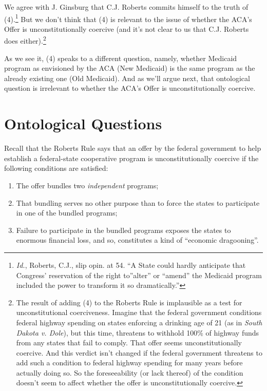 \documentclass[
  11pt,
  letterpaper,
  DIV=11,
  numbers=noendperiod,
  twoside]{scrartcl}
\providecommand{\tightlist}{%
  \setlength{\itemsep}{0pt}\setlength{\parskip}{0pt}}
\begin{document}
We agree with J. Ginsburg that C.J. Roberts commits himself to the truth
of (4).\footnote{\emph{Id.}, Roberts, C.J., slip opin. at 54. ``A State
  could hardly anticipate that Congress' reservation of the right
  to''alter'' or ``amend'' the Medicaid program included the power to
  transform it so dramatically.''} But we don't think that (4) is
relevant to the issue of whether the ACA's Offer is unconstitutionally
coercive (and it's not clear to us that C.J. Roberts does
either).\footnote{The result of adding (4) to the Roberts Rule is
  implausible as a test for unconstitutional coerciveness. Imagine that
  the federal government conditions federal highway spending on states
  enforcing a drinking age of 21 (as in \emph{South Dakota v. Dole}),
  but this time, threatens to withhold 100\% of highway funds from any
  states that fail to comply. That offer seems unconstitutionally
  coercive. And this verdict isn't changed if the federal government
  threatens to add such a condition to federal highway spending for many
  years before actually doing so. So the foreseeability (or lack
  thereof) of the condition doesn't seem to affect whether the offer is
  unconstitutionally coercive.}

As we see it, (4) speaks to a different question, namely, whether
Medicaid program as envisioned by the ACA (New Medicaid) is the same
program as the already existing one (Old Medicaid). And as we'll argue
next, that ontological question is irrelevant to whether the ACA's Offer
is unconstitutionally coercive.

\section{Ontological Questions}\label{ontological-questions}

Recall that the Roberts Rule says that an offer by the federal
government to help establish a federal-state cooperative program is
unconstitutionally coercive if the following conditions are satisfied:

\begin{enumerate}
\def\labelenumi{\arabic{enumi}.}
\tightlist
\item
  The offer bundles two \emph{independent} programs;
\item
  That bundling serves no other purpose than to force the states to
  participate in one of the bundled programs;
\item
  Failure to participate in the bundled programs exposes the states to
  enormous financial loss, and so, constitutes a kind of ``economic
  dragooning''.
\end{enumerate}
\end{document}
